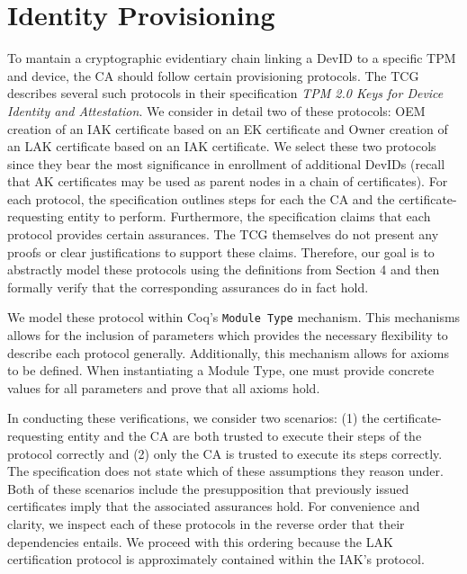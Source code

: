 \chapter{Identity Provisioning}


To mantain a cryptographic evidentiary chain linking a DevID to a specific TPM and device, the CA should follow certain provisioning protocols. The TCG describes several such protocols in their specification \textit{TPM 2.0 Keys for Device Identity and Attestation}. We consider in detail two of these protocols: OEM creation of an IAK certificate based on an EK certificate and Owner creation of an LAK certificate based on an IAK certificate. We select these two protocols since they bear the most significance in enrollment of additional DevIDs (recall that AK certificates may be used as parent nodes in a chain of certificates). For each protocol, the specification outlines steps for each the CA and the certificate-requesting entity to perform. Furthermore, the specification claims that each protocol provides certain assurances. The TCG themselves do not present any proofs or clear justifications to support these claims. Therefore, our goal is to abstractly model these protocols using the definitions from Section 4 and then formally verify that the corresponding assurances do in fact hold. 


We model these protocol within Coq's \verb|Module Type| mechanism. This mechanisms allows for the inclusion of parameters which provides the necessary flexibility to describe each protocol generally. Additionally, this mechanism allows for axioms to be defined. When instantiating a Module Type, one must provide concrete values for all parameters and prove that all axioms hold.

In conducting these verifications, we consider two scenarios: (1) the certificate-requesting entity and the CA are both trusted to execute their steps of the protocol correctly and (2) only the CA is trusted to execute its steps correctly. The specification does not state which of these assumptions they reason under. Both of these scenarios include the presupposition that 
previously issued certificates imply that the associated assurances hold.
For convenience and clarity, we inspect each of these protocols in the reverse order that their dependencies entails. We proceed with this ordering because the LAK certification protocol is approximately contained within the IAK's protocol. 



